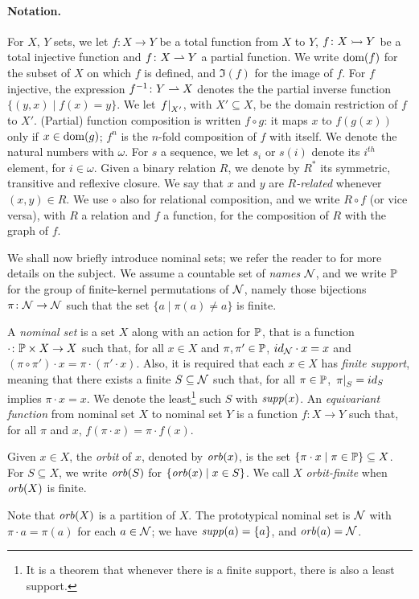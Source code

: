 \paragraph{Notation.} For $X$, $Y$ sets, we let $f \colon X \to Y$ be a total function from $X$ to $Y$, $f \colon X \rightarrowtail Y$ be a total injective function and $f \colon X \rightharpoonup Y$ a partial function. We write $\operatorname{dom}(f)$ for the subset of $X$ on which $f$ is defined, and $\Im(f)$ for the image of $f$. For $f$ injective, the expression $f^{-1} \colon Y \rightharpoonup X$ denotes the the partial inverse function $\{(y,x) \mid f(x) = y \}$. We let $\left.f\right|_{X'}$, with $X' \subseteq X$, be the domain restriction of $f$ to $X'$. (Partial) function composition is written $f \circ g$: it maps $x$ to $f(g(x))$ only if $x \in \operatorname{dom}(g)$; $f^n$ is the $n$-fold composition of $f$ with itself. We denote the natural numbers with $\omega$. For $s$ a sequence, we let $s_i$ or $s(i)$ denote its $i^{\mathit{th}}$ element, for $i \in \omega$. Given a binary relation $R$, we denote by $R^*$ its symmetric, transitive and reflexive closure. We say that $x$ and $y$ are \emph{$R$-related} whenever $(x,y) \in R$. We use $\circ$ also for relational composition, and we write $R \circ f$ (or vice versa), with $R$ a relation and $f$ a function, for the composition of $R$ with the graph of $f$.

We shall now briefly introduce nominal sets; we refer the reader to \cite{GP02} for more details on the subject. We assume a countable set of \emph{names} $\mathcal{N}$, and we write $\mathbb{P}$ for the group of finite-kernel permutations of $\mathcal{N}$, namely those bijections $\pi \colon \mathcal{N} \to \mathcal{N}$ such that the set $\{ a \mid \pi(a) \neq a \}$ is finite.
\begin{definition}
A \emph{nominal set} is a set $X$ along with an action for $\mathbb{P}$, that is a function $\cdot \colon \mathbb{P} \times X \to X$ such that, for all $x \in X$ and $\pi,\pi' \in \mathbb{P}$, $id_{\mathcal{N}} \cdot x = x$ and $(\pi \circ \pi') \cdot x = \pi \cdot (\pi' \cdot x)$. Also, it is required that each $x \in X$ has \emph{finite support}, meaning that there exists a finite $S \subseteq \mathcal{N}$ such that, for all $\pi \in \mathbb{P}$, $\left.\pi\right|_{S} = id_S$ implies $\pi \cdot x = x$. We denote the least\footnote{It is a theorem that whenever there is a finite support, there is also a least support.} such $S$ with $\mathit{supp}(x)$. An \emph{equivariant function} from nominal set $X$ to nominal set $Y$ is a function $f : X \to Y$ such that, for all $\pi$ and $x$, $f(\pi \cdot x) = \pi \cdot f(x)$.
\end{definition}
%
\begin{definition}
Given $x \in X$, the \emph{orbit} of $x$, denoted by $\mathit{orb}(x) $, is the set $\{ \pi \cdot x \mid \pi \in \mathbb{P}\} \subseteq X$. For $S \subseteq X$, we write $\mathit{orb}(S)$ for $\{ \mathit{orb}(x) \mid x \in S\}$. We call $X$ \emph{orbit-finite} when $\mathit{orb}(X)$ is finite.
\end{definition}

\noindent Note that $\mathit{orb}(X)$ is a partition of $X$. The prototypical nominal set is $\mathcal{N}$ with $\pi \cdot a = \pi(a)$ for each $a \in \mathcal{N}$; we have $\mathit{supp}(a) = \{a\}$, and $\mathit{orb}(a) = \mathcal{N}$.

